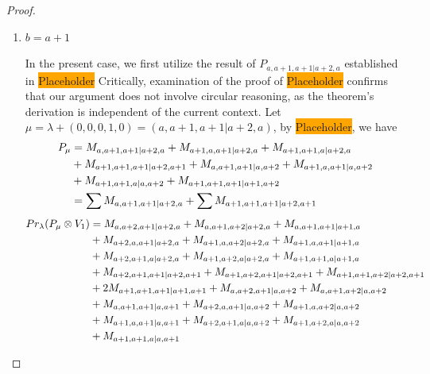 \begin{proof}
\begin{enumerate}
\begin{enumerate}
        \item $b=a+1$ \par
        In the present case, we first utilize the result of $P_{a,a+1,a+1|a+2,a}$ established in \colorbox{orange}{Placeholder} Critically, examination of the proof of \colorbox{orange}{Placeholder} confirms that our argument does not involve circular reasoning, as the theorem's derivation is independent of the current context. Let $\mu = \lambda + (0,0,0,1,0) =(a,a+1,a+1|a+2,a) $, by \colorbox{orange}{Placeholder}, we have
        \begin{equation}\notag
          \begin{aligned}
            P_\mu &= 
M_{a,a+1,a+1|a+2,a}
+M_{a+1,a,a+1|a+2,a}
+M_{a+1,a+1,a|a+2,a}\\
                                               &
+M_{a+1,a+1,a+1|a+2,a+1}
+M_{a,a+1,a+1|a,a+2}
+M_{a+1,a,a+1|a,a+2}\\
                                               &
+M_{a+1,a+1,a|a,a+2}
+M_{a+1,a+1,a+1|a+1,a+2}\\
                  &=
\sum M_{a,a+1,a+1|a+2,a}
+\sum M_{a+1,a+1,a+1|a+2,a+1}
          \end{aligned}
        \end{equation}
        \begin{equation}\notag
          \begin{aligned}
            Pr_{\lambda}(P_\mu \otimes V_{1}) &=
M_{a,a+2,a+1|a+2,a}
+ M_{a,a+1,a+2|a+2,a}
+ M_{a,a+1,a+1|a+1,a}\\
                                              &
+ M_{a+2,a,a+1|a+2,a}
+ M_{a+1,a,a+2|a+2,a}
+ M_{a+1,a,a+1|a+1,a}\\
                                              &
+ M_{a+2,a+1,a|a+2,a}
+ M_{a+1,a+2,a|a+2,a}
+ M_{a+1,a+1,a|a+1,a}\\
                                              &
+ M_{a+2,a+1,a+1|a+2,a+1}
+ M_{a+1,a+2,a+1|a+2,a+1}
+ M_{a+1,a+1,a+2|a+2,a+1}\\
                                              &
+ 2M_{a+1,a+1,a+1|a+1,a+1}
+ M_{a,a+2,a+1|a,a+2}
+ M_{a,a+1,a+2|a,a+2}\\
                                              &
+ M_{a,a+1,a+1|a,a+1}
+ M_{a+2,a,a+1|a,a+2}
+ M_{a+1,a,a+2|a,a+2}\\
                                              &
+ M_{a+1,a,a+1|a,a+1}
+ M_{a+2,a+1,a|a,a+2}
+ M_{a+1,a+2,a|a,a+2}\\
                                              &
+ M_{a+1,a+1,a|a,a+1}

\end{aligned}
\end{equation}
\end{enumerate}
\end{enumerate}
\end{proof}
